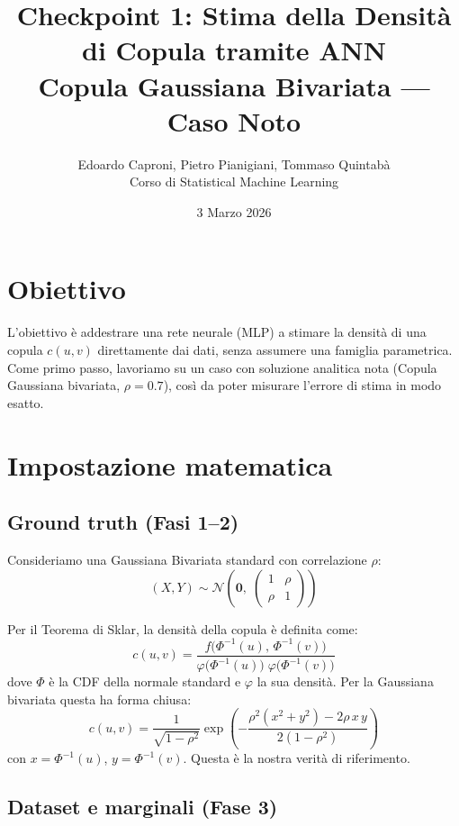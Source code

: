 \documentclass[11pt, a4paper]{article}
\title{Checkpoint 1: Stima della Densità di Copula tramite ANN\\
\large Copula Gaussiana Bivariata --- Caso Noto}
\author{Edoardo Caproni, Pietro Pianigiani, Tommaso Quintabà\\
\small Corso di Statistical Machine Learning}
\date{3 Marzo 2026}
\begin{document}
\maketitle

\section{Obiettivo}

L'obiettivo è addestrare una rete neurale (MLP) a stimare la densità di una copula $c(u,v)$ direttamente dai dati, senza assumere una famiglia parametrica.
Come primo passo, lavoriamo su un caso con soluzione analitica nota (Copula Gaussiana bivariata, $\rho=0.7$), così da poter misurare l'errore di stima in modo esatto.

\section{Impostazione matematica}

\subsection{Ground truth (Fasi 1--2)}

Consideriamo una Gaussiana Bivariata standard con correlazione $\rho$:
\[
(X, Y) \sim \mathcal{N}\!\left(\mathbf{0},\; \begin{pmatrix} 1 & \rho \\ \rho & 1 \end{pmatrix}\right)
\]

Per il Teorema di Sklar, la densità della copula è definita come:
\[
c(u,v) = \frac{f\bigl(\Phi^{-1}(u),\, \Phi^{-1}(v)\bigr)}{\varphi\bigl(\Phi^{-1}(u)\bigr)\;\varphi\bigl(\Phi^{-1}(v)\bigr)}
\]
dove $\Phi$ è la CDF della normale standard e $\varphi$ la sua densità.
Per la Gaussiana bivariata questa ha forma chiusa:
\[
c(u,v) = \frac{1}{\sqrt{1-\rho^2}} \exp\!\left(-\frac{\rho^2(x^2+y^2) - 2\rho\, x\, y}{2(1-\rho^2)}\right)
\]
con $x = \Phi^{-1}(u)$, $y = \Phi^{-1}(v)$. Questa è la nostra verità di riferimento.

\subsection{Dataset e marginali (Fase 3)}
\end{document}
